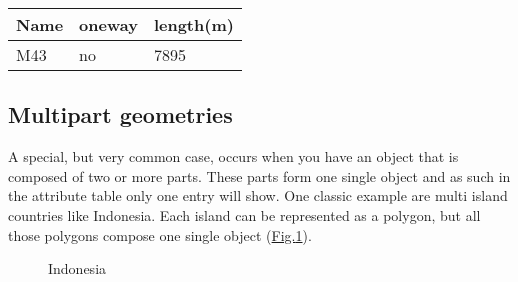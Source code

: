 \documentclass[letterpaper,10pt,english]{sphinxmanual}
\begin{document}
\begin{savenotes}\sphinxattablestart
\centering
\begin{tabulary}{\linewidth}[t]{|T|T|T|}
\hline
\sphinxstyletheadfamily 
Name
&\sphinxstyletheadfamily 
one\sphinxhyphen{}way
&\sphinxstyletheadfamily 
length(m)
\\
\hline
M43
&
no
&
7895
\\
\hline
\end{tabulary}
\par
\sphinxattableend\end{savenotes}


\subsection{Multipart geometries}
\label{\detokenize{vector_representations:multipart-geometries}}
A special, but very common case, occurs when you have an object that is composed of two or more parts. These parts form one single object and as such
in the attribute table only one entry will show. One classic example are multi island countries like Indonesia. Each island can be represented as a polygon, but all those polygons compose one single object (\hyperref[\detokenize{vector_representations:indonesia}]{Fig.\@ \ref{\detokenize{vector_representations:indonesia}}}).

\begin{figure}[htbp]
\centering
\capstart

\noindent{}
\caption{Indonesia}\label{\detokenize{vector_representations:id3}}\label{\detokenize{vector_representations:indonesia}}\end{figure}
\end{document}
